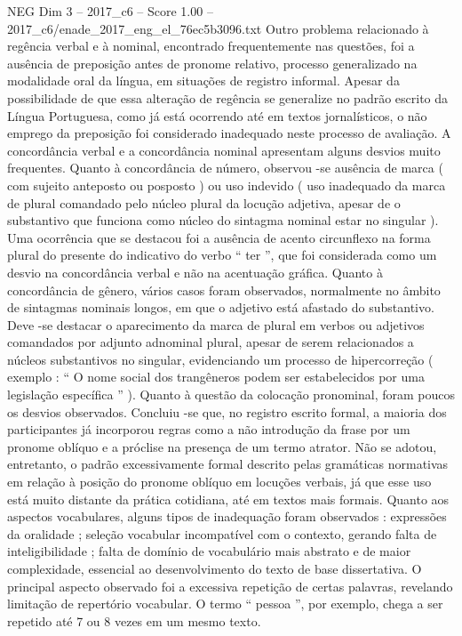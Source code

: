 \begin{textsample}{NEG Dim 3 – 2017\_c6 – Score 1.00 – 2017\_c6/enade\_2017\_eng\_el\_76ec5b3096.txt}
Outro problema relacionado à regência verbal e à nominal, encontrado frequentemente nas questões, foi a ausência de preposição antes de pronome relativo, processo generalizado na modalidade oral da língua, em situações de registro informal.
Apesar da possibilidade de que essa alteração de regência se generalize no padrão escrito da Língua Portuguesa, como já está ocorrendo até em textos jornalísticos, o não emprego da preposição foi considerado inadequado neste processo de avaliação.
A concordância verbal e a concordância nominal apresentam alguns desvios muito frequentes.
Quanto à concordância de número, observou -se ausência de marca ( com sujeito anteposto ou posposto ) ou uso indevido ( uso inadequado da marca de plural comandado pelo núcleo plural da locução adjetiva, apesar de o substantivo que funciona como núcleo do sintagma nominal estar no singular ).
Uma ocorrência que se destacou foi a ausência de acento circunflexo na forma plural do presente do indicativo do verbo “ ter ”, que foi considerada como um desvio na concordância verbal e não na acentuação gráfica.
Quanto à concordância de gênero, vários casos foram observados, normalmente no âmbito de sintagmas nominais longos, em que o adjetivo está afastado do substantivo.
Deve -se destacar o aparecimento da marca de plural em verbos ou adjetivos comandados por adjunto adnominal plural, apesar de serem relacionados a núcleos substantivos no singular, evidenciando um processo de hipercorreção ( exemplo : “ O nome social dos trangêneros podem ser estabelecidos por uma legislação específica ” ).
Quanto à questão da colocação pronominal, foram poucos os desvios observados.
Concluiu -se que, no registro escrito formal, a maioria dos participantes já incorporou regras como a não introdução da frase por um pronome oblíquo e a próclise na presença de um termo atrator.
Não se adotou, entretanto, o padrão excessivamente formal descrito pelas gramáticas normativas em relação à posição do pronome oblíquo em locuções verbais, já que esse uso está muito distante da prática cotidiana, até em textos mais formais.
Quanto aos aspectos vocabulares, alguns tipos de inadequação foram observados : expressões da oralidade ; seleção vocabular incompatível com o contexto, gerando falta de inteligibilidade ; falta de domínio de vocabulário mais abstrato e de maior complexidade, essencial ao desenvolvimento do texto de base dissertativa.
O principal aspecto observado foi a excessiva repetição de certas palavras, revelando limitação de repertório vocabular.
O termo “ pessoa ”, por exemplo, chega a ser repetido até 7 ou 8 vezes em um mesmo texto.

\end{textsample}
